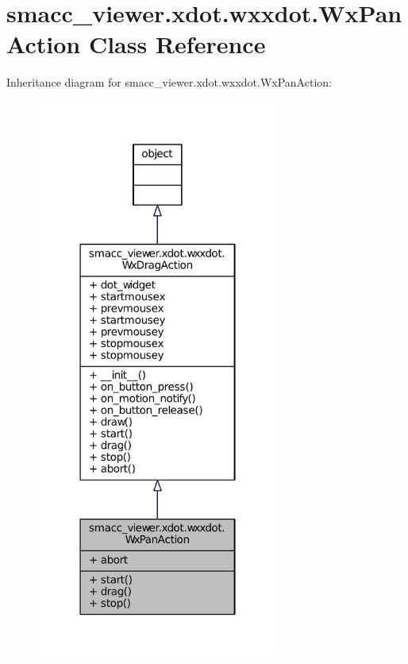 \hypertarget{classsmacc__viewer_1_1xdot_1_1wxxdot_1_1WxPanAction}{}\section{smacc\+\_\+viewer.\+xdot.\+wxxdot.\+Wx\+Pan\+Action Class Reference}
\label{classsmacc__viewer_1_1xdot_1_1wxxdot_1_1WxPanAction}


Inheritance diagram for smacc\+\_\+viewer.\+xdot.\+wxxdot.\+Wx\+Pan\+Action\+:
\nopagebreak
\begin{figure}[H]
\begin{center}
\leavevmode
\includegraphics[width=226pt]{classsmacc__viewer_1_1xdot_1_1wxxdot_1_1WxPanAction__inherit__graph}
\end{center}
\end{figure}


